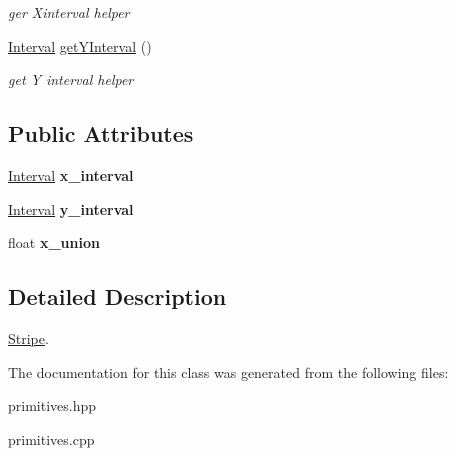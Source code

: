 \begin{DoxyCompactItemize}
\begin{DoxyCompactList}\small\item\em ger Xinterval helper \end{DoxyCompactList}\item 
\mbox{\label{classStripe_a9fa20f20b1ae8fba317967418f98dd51}} 
\hyperlink{classInterval}{Interval} \hyperlink{classStripe_a9fa20f20b1ae8fba317967418f98dd51}{get\+Y\+Interval} ()
\begin{DoxyCompactList}\small\item\em get Y interval helper \end{DoxyCompactList}\end{DoxyCompactItemize}
\subsection*{Public Attributes}
\begin{DoxyCompactItemize}
\item 
\mbox{\label{classStripe_a7b0334259196ee093d8144c301ac8b2d}} 
\hyperlink{classInterval}{Interval} {\bfseries x\+\_\+interval}
\item 
\mbox{\label{classStripe_a503fd91504497fa99df8f0c86067476b}} 
\hyperlink{classInterval}{Interval} {\bfseries y\+\_\+interval}
\item 
\mbox{\label{classStripe_a9f570334815593db7f757e43e72f567c}} 
float {\bfseries x\+\_\+union}
\end{DoxyCompactItemize}


\subsection{Detailed Description}
\hyperlink{classStripe}{Stripe}. 

The documentation for this class was generated from the following files\+:\begin{DoxyCompactItemize}
\item 
primitives.\+hpp\item 
primitives.\+cpp\end{DoxyCompactItemize}
